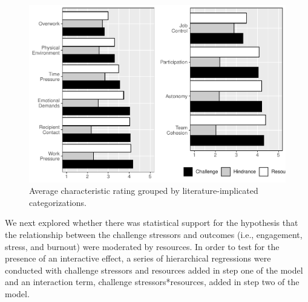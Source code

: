 \documentclass[
  man,mask]{apa7}
\begin{document}
\begin{figure}
\centering
\includegraphics{Submission_files/figure-latex/scalelevelgraphs-1.pdf}
\caption{\label{fig:scalelevelgraphs}Average characteristic rating grouped by literature-implicated categorizations.}
\end{figure}

We next explored whether there was statistical support for the hypothesis that the relationship between the challenge stressors and outcomes (i.e., engagement, stress, and burnout) were moderated by resources. In order to test for the presence of an interactive effect, a series of hierarchical regressions were conducted with challenge stressors and resources added in step one of the model and an interaction term, challenge stressors*resources, added in step two of the model.
\end{document}
